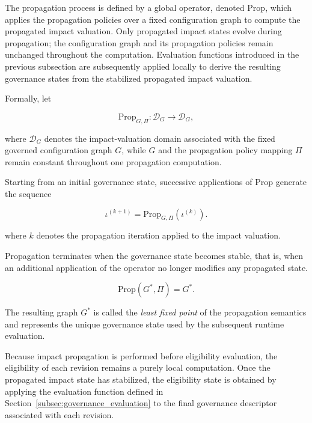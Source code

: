 \documentclass[10pt]{article}
\begin{document}
The propagation process is defined by a global operator, denoted
$\mathrm{Prop}$, which applies the propagation policies over a fixed
configuration graph to compute the propagated impact valuation.
Only propagated impact states evolve during propagation; the configuration graph and its propagation policies remain unchanged throughout the computation. Evaluation functions introduced in the previous subsection are subsequently applied locally to derive the resulting governance states from the stabilized propagated impact valuation.

Formally, let

\begin{equation}
	\label{eq:prop_operator}
     \mathrm{Prop}_{G,\Pi} :
     \mathcal{D}_G
     \rightarrow
      \mathcal{D}_G,
\end{equation}

where $\mathcal{D}_G$ denotes the impact-valuation domain associated with the fixed governed configuration graph $G$, while $G$ and the propagation policy mapping $\Pi$ remain constant throughout one propagation computation.

Starting from an initial governance state, successive applications of
$\mathrm{Prop}$ generate the sequence

\begin{equation}
	\label{eq:prop_iteration}
	\iota^{(k+1)}
	=
	\mathrm{Prop}_{G,\Pi}
	\!\left(
	\iota^{(k)}
	\right).
\end{equation}

where $k$ denotes the propagation iteration applied to the impact valuation.

Propagation terminates when the governance state becomes stable, that is, when an additional application of the operator no longer modifies any propagated state.

\begin{equation}
	\label{eq:fixed_point}
	\mathrm{Prop}
	\!\left(
	G^{*},
	\Pi
	\right)
	=
	G^{*}.
\end{equation}

The resulting graph $G^{*}$ is called the \emph{least fixed point} of the propagation semantics and represents the unique governance state used by the subsequent runtime evaluation.

Because impact propagation is performed before eligibility evaluation,
the eligibility of each revision remains a purely local computation.
Once the propagated impact state has stabilized, the eligibility state is
obtained by applying the evaluation function defined in
Section~\ref{subsec:governance_evaluation} to the final governance descriptor associated with each revision.
\end{document}
